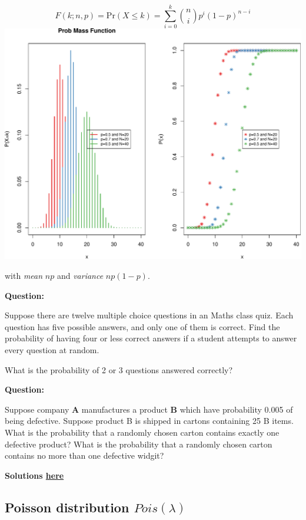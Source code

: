 \documentclass[]{article}
\numberwithin{equation}{section}
\begin{document}
\[
F(k;n,p) = \mbox{Pr}(X\leq k) = \sum_{i=0}^{k}\binom{n}{i} p^i (1-p)^{n-i}
\] \includegraphics{index_files/figure-latex/unnamed-chunk-141-1.pdf}

with \emph{mean} \(np\) and \emph{variance} \(np(1-p)\).

\textbf{Question:}

Suppose there are twelve multiple choice questions in an Maths class
quiz. Each question has five possible answers, and only one of them is
correct. Find the probability of having four or less correct answers if
a student attempts to answer every question at random.

What is the probability of 2 or 3 questions answered correctly?

\textbf{Question:}

Suppose company \textbf{A} manufactures a product \textbf{B} which have
probability 0.005 of being defective. Suppose product B is shipped in
cartons containing 25 B items. What is the probability that a randomly
chosen carton contains exactly one defective product? What is the
probability that a randomly chosen carton contains no more than one
defective widgit?

\textbf{Solutions \href{IntroSM_sol.html}{here}}

\subsection{\texorpdfstring{Poisson distribution
\(Pois(\lambda)\)}{Poisson distribution Pois(\textbackslash{}lambda)}}\label{poisson-distribution-poislambda}
\end{document}
